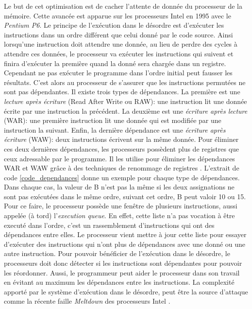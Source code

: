 Le but de cet optimisation est de cacher l'attente de donnée du processeur de la mémoire. Cette avancée est apparue sur les processeurs Intel en 1995 avec le \textit{Pentium P6}. Le principe de l'exécution dans le désordre est d'exécuter les instructions dans un ordre différent que celui donné par le code source.  Ainsi lorsqu'une instruction doit attendre une donnée, au lieu de perdre des cycles à attendre ces données, le processeur va exécuter les instructions qui suivent et finira d'exécuter la première quand la donné sera chargée dans un registre. 
Cependant ne pas exécuter le programme dans l'ordre initial peut fausser les résultats. C'est alors au processeur de s'assurer que les instructions permutées ne sont pas dépendantes. Il existe trois types de dépendances. La première est une \textit{lecture après écriture} (Read After Write ou RAW): une instruction lit une donnée écrite par une instruction la précédent. La deuxième est une \textit{écriture après lecture} (WAR): une première instruction lit une donnée qui est modifiée par une instruction la suivant. Enfin, la dernière dépendance est une \textit{écriture après écriture} (WAW): deux instructions écrivent sur la même donnée. Pour éliminer ces deux dernières dépendances, les processeurs possèdent plus de registres que ceux adressable par le programme. Il les utilise pour éliminer les dépendances WAR et WAW grâce à des techniques de renommage de registres \cite{903248}. 
L'extrait de code \ref{code_dependances} donne un exemple pour chaque type de dépendances. Dans chaque cas, la valeur de B n'est pas la même si les deux assignations ne sont pas exécutées dans le même ordre, suivant cet ordre, B peut valoir 10 ou 15. Pour ce faire, le processeur possède une fenêtre de plusieurs instructions, aussi appelée (à tord) l'\textit{execution queue}. En effet, cette liste n'a pas vocation à être executé dans l'ordre, c'est un rassemblement d'instructions qui ont des dépendances entre elles. Le processeur vient mettre à jour cette liste pour essayer d'exécuter des instructions qui n'ont plus de dépendances avec une donné ou une autre instruction.
Pour pouvoir bénéficier de l'exécution dans le désordre, le processeurs doit donc détecter si les instructions sont dépendantes pour pouvoir les réordonner. Aussi, le programmeur peut aider le processeur dans son travail en évitant au maximum les dépendances entre les instructions. 
La complexité apporté par le système d'exécution dans le désordre, peut être la source d'attaque comme la récente faille \textit{Meltdown} des processeurs Intel \cite{DBLP:journals/corr/abs-1801-01207}.


